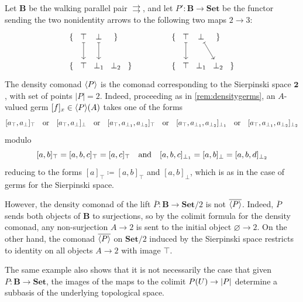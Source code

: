 \documentclass[11pt, oneside, article]{memoir}
\theoremstyle{plain}
\theoremstyle{definition}
\theoremstyle{remark}
\newenvironment{counterexample}
{\renewcommand\qedsymbol{$\lrcorner$}%
  \pushQED{\qed}\mycounterexample}
{\popQED\endmycounterexample}
\DeclarePairedDelimiter{\gen}{\langle}{\rangle}
\DeclarePairedDelimiter{\abs}{\lvert}{\rvert}
\newcommand{\tn}[1]{\textnormal{#1}}
\newcommand{\namedcat}[1]{\mathbf{#1}}
\newcommand{\cat}[1]{\mathbf{#1}}
\newcommand{\Set}{\namedcat{Set}}
\newcommand{\clift}[1]{\overline{#1}}
\newcommand{\pts}[1]{{\abs{#1}}}
\newcommand{\ptlift}[1]{\overline{#1}}
\newcommand{\arro}{\mathbf{2}}
\newcommand{\sier}{\arro}
\newcommand{\ph}[1]{#1}
\newcommand{\xA}{A}
\newcommand{\bB}{\cat{B}}
\newcommand{\bS}{\cat{S}}
\newcommand{\pP}{\ph{P}}
\newcommand{\cP}{\gen{\pP}}
\newcommand{\SetP}{\Set/\pts{\pP}}
\newcommand{\hh}[2][]{#1 \tn{#2} #1}
\newcommand{\qand}{\hh[\quad]{and}}
\newcommand{\qor}{\hh[\quad]{or}}
\begin{document}
\begin{counterexample}[Non-slicing subbasis]\label{ex:notdense}
  Let $\bB$ be the walking parallel pair $\rightrightarrows$, and let
  $\pP' \colon \bB \to \Set$ be the functor sending the two
  nonidentity arrows to the following two maps $2 \to 3$:
  \[
    \begin{tikzcd}[column sep=0]
      {\{} & \top & \bot & {\}} & \\
      {\{} & \top & \bot_1 & \bot_2 & {\}}
      \arrow[maps to, from=1-2, to=2-2]
      \arrow[maps to, from=1-3, to=2-3]
    \end{tikzcd}
    \qquad\qquad
    \begin{tikzcd}[column sep=0]
      {\{} & \top & \bot & {\}} & \\
      {\{} & \top & \bot_1 & \bot_2 & {\}}
      \arrow[maps to, from=1-2, to=2-2]
      \arrow[maps to, from=1-3, to=2-4]
    \end{tikzcd}
  \]
  The density comonad $\cP$ is the comonad corresponding to the
  Sierpinski space $\sier$, with set of points $|\pP| = 2$. Indeed, proceeding
  as in \cref{rem:densitygerms}, an $\xA$-valued germ
  $[f]_x \in \cP(\xA)$ takes one of the forms
  \[[a_\top, a_\bot]_\top \qor [a_\top, a_\bot]_\bot \qor [a_\top, a_{\bot_1}, a_{\bot_2}]_\top \qor [a_\top, a_{\bot_1}, a_{\bot_2}]_{\bot_1} \qor [a_\top, a_{\bot_1}, a_{\bot_2}]_{\bot_2}\]
  modulo
  \[[a, b]_\top = [a, b, c]_\top = [a, c]_\top \qand [a, b,
    c]_{\bot_1} = [a, b]_\bot = [a, b, d]_{\bot_2}\] reducing to the
  forms $[a]_\top \coloneqq [a, b]_\top $ and $[a, b]_{\bot}$, which
  is as in the case of germs for the Sierpinski space.
  
  However, the density comonad of the lift
  $\ptlift{\pP} \colon \bB \to \Set/2$ is not $\clift{\cP}$. Indeed,
  $\ptlift{\pP}$ sends both objects of $\bB$ to surjections, so by the
  colimit formula for the density comonad, any non-surjection
  $\xA \to 2$ is sent to the initial object $\varnothing \to 2$. On the
  other hand, the comonad $\clift{\cP}$ on $\Set/2$ induced by the
  Sierpinski space restricts to identity on all objects $\xA \to 2$
  with image $\top$.
\end{counterexample}

The same example also shows that it is not necessarily the case that
given $\pP \colon \bB\to\Set$, the images of the maps to the colimit
$\pP(U) \to \pts{\pP}$ determine a subbasis of the underlying
topological space.
\end{document}
